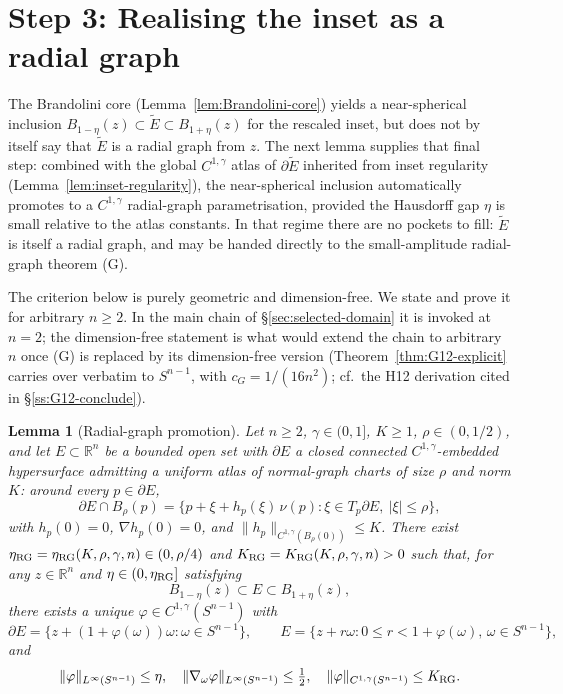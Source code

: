 \documentclass[11pt]{amsart}
\newtheorem{lemma}[theorem]{Lemma}
\newcommand{\R}{\mathbb R}
\newcommand{\Etil}{\widetilde E}
\begin{document}
\section{Step 3: Realising the inset as a radial graph}\label{sec:step3-radialgraph}
\label{sec:radialgraph}

The Brandolini core (Lemma~\ref{lem:Brandolini-core}) yields a
near-spherical inclusion
\(B_{1-\eta}(z)\subset\Etil\subset B_{1+\eta}(z)\) for the rescaled
inset, but does not by itself say that \(\Etil\) is a radial graph
from \(z\).  The next lemma supplies that final step: combined with
the global \(C^{1,\gamma}\) atlas of \(\partial\Etil\) inherited from
inset regularity (Lemma~\ref{lem:inset-regularity}), the
near-spherical inclusion automatically promotes to a \(C^{1,\gamma}\)
radial-graph parametrisation, provided the Hausdorff gap \(\eta\) is
small relative to the atlas constants.  In that regime there are no
pockets to fill: \(\Etil\) is itself a radial graph, and may be
handed directly to the small-amplitude radial-graph theorem (G).

The criterion below is purely geometric and dimension-free.  We
state and prove it for arbitrary \(n\ge 2\).  In the main chain of
\S\ref{sec:selected-domain} it is invoked at \(n=2\); the
dimension-free statement is what would extend the chain to
arbitrary \(n\) once (G) is replaced by its dimension-free version
(Theorem~\ref{thm:G12-explicit} carries over verbatim to
\(S^{n-1}\), with \(c_G=1/(16 n^2)\); cf.\ the H12 derivation cited
in \S\ref{ss:G12-conclude}).

\begin{lemma}[Radial-graph promotion]\label{lem:radialgraph}
Let \(n\ge 2\), \(\gamma\in(0,1]\), \(K\ge 1\), \(\rho\in(0,1/2)\),
and let \(E\subset\R^n\) be a bounded open set with \(\partial E\) a
closed connected \(C^{1,\gamma}\)-embedded hypersurface admitting a
uniform atlas of \emph{normal-graph charts} of size \(\rho\) and
norm \(K\): around every \(p\in\partial E\),
\[
   \partial E\cap B_\rho(p)
      =\bigl\{p+\xi+h_p(\xi)\,\nu(p):\xi\in T_p\partial E,\
         |\xi|\le\rho\bigr\},
\]
with \(h_p(0)=0\), \(\nabla h_p(0)=0\), and
\(\|h_p\|_{C^{1,\gamma}(B_\rho(0))}\le K\).  There exist
\(\eta_{\rm RG}=\eta_{\rm RG}(K,\rho,\gamma,n)\in(0,\rho/4)\) and
\(K_{\rm RG}=K_{\rm RG}(K,\rho,\gamma,n)>0\) such that, for any
\(z\in\R^n\) and \(\eta\in(0,\eta_{\rm RG}]\) satisfying
\begin{equation}\label{eq:RG-shell}
   B_{1-\eta}(z)\subset E\subset B_{1+\eta}(z),
\end{equation}
there exists a unique \(\varphi\in C^{1,\gamma}(S^{n-1})\) with
\begin{equation}\label{eq:RG-graph}
   \partial E
      =\bigl\{z+(1+\varphi(\omega))\omega:\omega\in S^{n-1}\bigr\},
   \qquad
   E=\bigl\{z+r\omega:0\le r<1+\varphi(\omega),\,\omega\in S^{n-1}
   \bigr\},
\end{equation}
and
\begin{equation}\label{eq:RG-bounds}
   \|\varphi\|_{L^\infty(S^{n-1})}\le\eta,
   \quad
   \|\nabla_\omega\varphi\|_{L^\infty(S^{n-1})}\le\tfrac12,
   \quad
   \|\varphi\|_{C^{1,\gamma}(S^{n-1})}\le K_{\rm RG}.
\end{equation}
\end{lemma}
\end{document}
